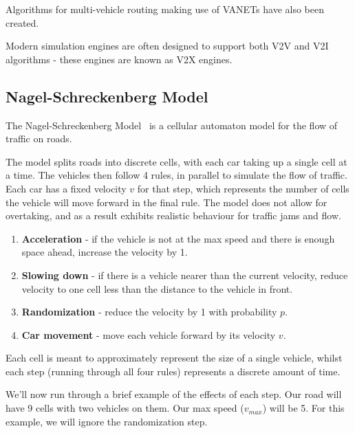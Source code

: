 \documentclass[ %
                    author={Alexander Hill},
                supervisor={Dr. Benjamin Sach},
                    degree={MEng},
                     title={MARMOSET},
                  subtitle={Multi-Agent Route Management using Online Simulation for Efficient Transportation},
                      type={research},
                      year={2016} ]{dissertation}
\begin{document}
Algorithms for multi-vehicle routing making use of VANETs have also been
created.

Modern simulation engines are often designed to support both V2V and V2I
algorithms - these engines are known as V2X engines.


\subsection{Nagel-Schreckenberg Model} \label{sec:nagel}

The Nagel-Schreckenberg Model~\cite{nagel} is a cellular automaton model for the flow of
traffic on roads.

The model splits roads into discrete cells, with each car taking up a single
cell at a time. The vehicles then follow 4 rules, in parallel to simulate the
flow of traffic. Each car has a fixed velocity $v$ for that step, which
represents the number of cells the vehicle will move forward in the final rule.
The model does not allow for overtaking, and as a result exhibits realistic
behaviour for traffic jams and flow.

\begin{enumerate}
    \item \textbf{Acceleration} - if the vehicle is not at the max speed and
        there is enough space ahead, increase the velocity by 1.
    \item \textbf{Slowing down} - if there is a vehicle nearer than the current
        velocity, reduce velocity to one cell less than the distance to the
        vehicle in front.
    \item \textbf{Randomization} - reduce the velocity by 1 with probability
        $p$.
    \item \textbf{Car movement} - move each vehicle forward by its velocity $v$.
\end{enumerate}

Each cell is meant to approximately represent the size of a single vehicle,
whilst each step (running through all four rules) represents a discrete amount
of time.

We'll now run through a brief example of the effects of each step. Our road will
have 9 cells with two vehicles on them. Our max speed ($v_{max}$) will be 5.
For this example, we will ignore the randomization step.

\begin{figure}[!h]
\centering
{}
\end{figure}
\end{document}
